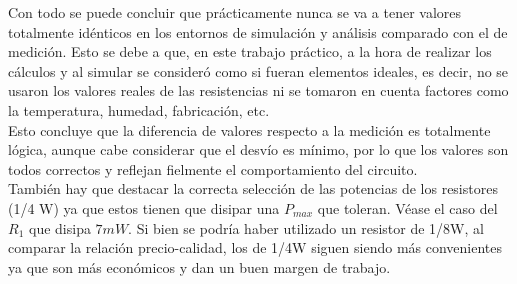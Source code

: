 \sangria{}Con todo se puede concluir que prácticamente nunca se va a tener valores totalmente idénticos en los entornos de simulación y análisis comparado con el de medición. Esto se debe a que, en este trabajo práctico, a la hora de realizar los cálculos y al simular se consideró como si fueran elementos ideales, es decir, no se usaron los valores reales de las resistencias ni se tomaron en cuenta factores como la temperatura, humedad, fabricación, etc. \\
\sangria{} Esto concluye que la diferencia de valores respecto a la medición es totalmente lógica, aunque cabe considerar que el desvío es mínimo, por lo que los valores son todos correctos y reflejan fielmente el comportamiento del circuito. \\
\sangria{} También hay que destacar la correcta selección de las potencias de los resistores (1/4 W) ya que estos tienen que disipar una $P_{max}$ que toleran. Véase el caso del $R_1$ que disipa $7mW$. Si bien se podría haber utilizado un resistor de 1/8W, al comparar la relación precio-calidad, los de 1/4W siguen siendo más convenientes ya que son más económicos y dan un buen margen de trabajo.
